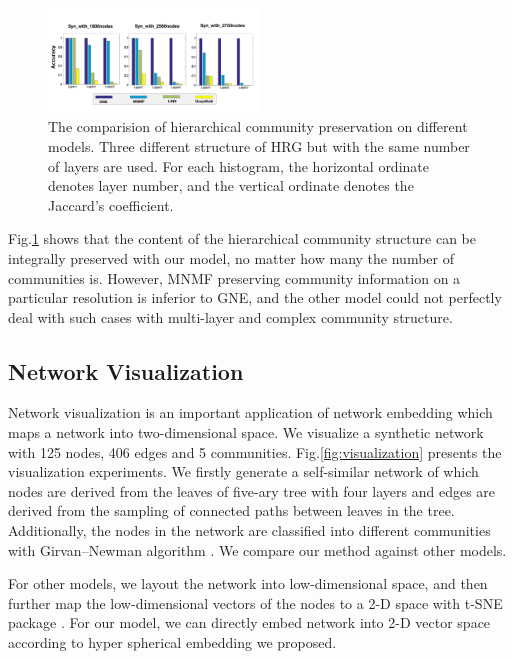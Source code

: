 \documentclass{article}
\theoremstyle{definition}
\begin{document}
	\begin{figure}[htbp]
		\center
		\includegraphics[width=0.5\textwidth]{figure/community_preservation.pdf}
		\caption{The comparision of hierarchical community preservation on different models. Three different structure of HRG but with the same number of layers are used. For each histogram, the horizontal ordinate denotes layer number, and the vertical ordinate denotes the Jaccard's coefficient.}
		\label{fig:community_preservation}
	\end{figure}
	Fig.\ref{fig:community_preservation} shows that the content of the hierarchical community structure can be integrally preserved with our model, no matter how many the number of communities is. However, MNMF preserving community information on a particular resolution is inferior to GNE, and the other model could not perfectly deal with such cases with multi-layer and complex community structure.

	\subsection{Network Visualization}
	Network visualization is an important application of network embedding which maps a network into two-dimensional space. We visualize a synthetic network with 125 nodes, 406 edges and 5 communities. Fig.\ref{fig:visualization} presents the visualization experiments. We firstly generate a self-similar network of which nodes are derived from the leaves of five-ary tree with four layers and edges are derived from the sampling of connected paths between leaves in the tree. Additionally, the nodes in the network are classified into different communities with Girvan–Newman algorithm \cite{girvan2002community}. We compare our method against other models.

	For other models, we layout the network into low-dimensional space, and then further map the low-dimensional vectors of the nodes to a 2-D space with t-SNE package \cite{Maaten2008Visualizing}. For our model, we can directly embed network into 2-D vector space according to hyper spherical embedding we proposed.
\end{document}
